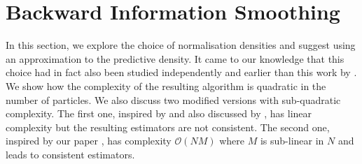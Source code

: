 




\section{Backward Information Smoothing}
In this section, we explore the choice of normalisation densities and suggest using an approximation to the predictive density. It came to our knowledge that this choice had in fact also been studied independently and earlier than this work by \citet{taghavi12}. 
We show how the complexity of the resulting algorithm is quadratic in the number of particles. 
We also discuss two modified versions with sub-quadratic complexity. 
The first one, inspired by \citet{fearnhead10} and also discussed by \citet{taghavi12}, has linear complexity but the resulting estimators are not consistent. 
The second one, inspired by our paper \citep{lienart15}, has complexity $\mathcal O(NM)$ where $M$ is sub-linear in $N$ and leads to consistent estimators. 

